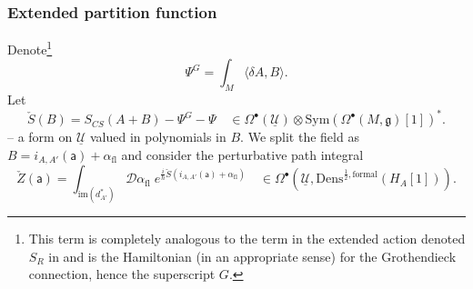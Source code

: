 \documentclass[11pt,a4paper]{amsart}
\theoremstyle{plain} %
\theoremstyle{definition}
\theoremstyle{remark}
\newcommand{\g}{\mathfrak{g}}
\newcommand{\mr}{\mathrm}
\newcommand{\sfa}{\mathsf{a}}
\newcommand{\bt}{\bullet}
\newcommand{\mc}{\mathcal}
\begin{document}
{\subsubsection{Extended partition function}
Denote\footnote{This term is completely analogous to the term in the extended action denoted $S_R$ in \cite{Bonechi2012} and is the Hamiltonian (in an appropriate sense) for  
the Grothendieck connection, hence the superscript $G$.} 
$$ \Psi^G= \int_M\langle \delta A,B \rangle. $$
Let 
\begin{equation}
    \check{S}(B)=S_{CS}(A+B)-\Psi^G - \Psi
     \quad \in \Omega^{\bt}(\underline{\mc{U}})\otimes \mr{Sym}(\Omega^\bt(M,\g)[1])^*.
\end{equation}
-- a form on $\underline{\mc{U}}$ valued in polynomials in $B$. We split the field as $B=i_{A,A'}(\sfa)+\alpha_\mr{fl}$ and consider the perturbative path integral
\begin{equation}\label{Z check}
    \check{Z}(\sfa)=\int_{\mr{im}(d^*_{A'})} \mc{D}\alpha_\mr{fl} \; e^{\frac{i}{\hbar} \check{S}(i_{A,A'}(\sfa)+\alpha_\mr{fl})}\quad \in \Omega^\bt(\underline{\mc{U}}, \mr{Dens}^{\frac12,\mr{formal}}(H_A[1]) ).
\end{equation}

}
\end{document}
